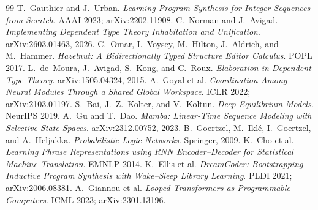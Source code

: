 \documentclass[11pt]{article}
\begin{document}
\begin{thebibliography}{99}
 T.~Gauthier and J.~Urban.
  \emph{Learning Program Synthesis for Integer Sequences from Scratch}.
  AAAI 2023; arXiv:2202.11908.
 C.~Norman and J.~Avigad.
  \emph{Implementing Dependent Type Theory Inhabitation and Unification}.
  arXiv:2603.01463, 2026.
 C.~Omar, I.~Voysey, M.~Hilton, J.~Aldrich, and M.~Hammer.
  \emph{Hazelnut: A Bidirectionally Typed Structure Editor Calculus}. POPL 2017.
 L.~de~Moura, J.~Avigad, S.~Kong, and C.~Roux.
  \emph{Elaboration in Dependent Type Theory}. arXiv:1505.04324, 2015.
 A.~Goyal et al.
  \emph{Coordination Among Neural Modules Through a Shared Global Workspace}.
  ICLR 2022; arXiv:2103.01197.
 S.~Bai, J.~Z.~Kolter, and V.~Koltun.
  \emph{Deep Equilibrium Models}. NeurIPS 2019.
 A.~Gu and T.~Dao.
  \emph{Mamba: Linear-Time Sequence Modeling with Selective State Spaces}.
  arXiv:2312.00752, 2023.
 B.~Goertzel, M.~Ikl\'e, I.~Goertzel, and A.~Heljakka.
  \emph{Probabilistic Logic Networks}. Springer, 2009.
 K.~Cho et al.
  \emph{Learning Phrase Representations using RNN Encoder--Decoder for Statistical
  Machine Translation}. EMNLP 2014.
 K.~Ellis et al.
  \emph{DreamCoder: Bootstrapping Inductive Program Synthesis with Wake--Sleep Library
  Learning}. PLDI 2021; arXiv:2006.08381.
 A.~Giannou et al.
  \emph{Looped Transformers as Programmable Computers}. ICML 2023; arXiv:2301.13196.
\end{thebibliography}
\end{document}
